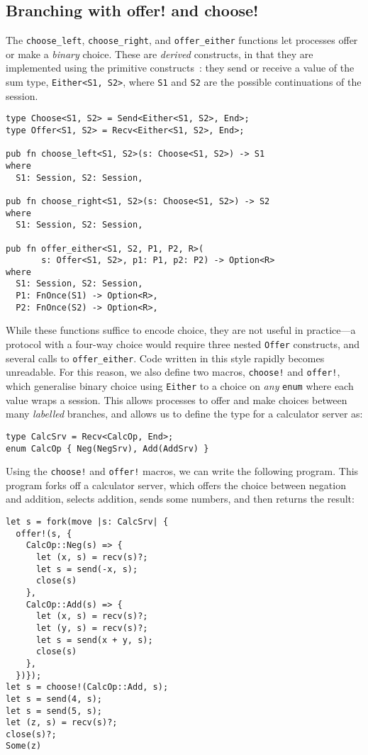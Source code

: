 \documentclass[sigconf,natbib=false]{acmart}
\begin{document}
\subsection{Branching with offer! and choose!}
The \lstinline{choose_left}, \lstinline{choose_right}, and \lstinline{offer_either} functions let processes offer or make a \emph{binary} choice. These are \emph{derived} constructs, in that they are implemented using the primitive constructs~\parencite{honda1993,dardha2017}: they send or receive a value of the sum type, \lstinline{Either<S1, S2>}, where \lstinline{S1} and \lstinline{S2} are the possible continuations of the session.
\begin{lstlisting}
type Choose<S1, S2> = Send<Either<S1, S2>, End>;
type Offer<S1, S2> = Recv<Either<S1, S2>, End>;

pub fn choose_left<S1, S2>(s: Choose<S1, S2>) -> S1
where
  S1: Session, S2: Session,

pub fn choose_right<S1, S2>(s: Choose<S1, S2>) -> S2
where
  S1: Session, S2: Session,

pub fn offer_either<S1, S2, P1, P2, R>(
       s: Offer<S1, S2>, p1: P1, p2: P2) -> Option<R>
where
  S1: Session, S2: Session,
  P1: FnOnce(S1) -> Option<R>,
  P2: FnOnce(S2) -> Option<R>,
\end{lstlisting}
While these functions suffice to encode choice, they are not useful in practice---a protocol with a four-way choice would require three nested \lstinline{Offer} constructs, and several calls to \lstinline{offer_either}. Code written in this style rapidly becomes unreadable. For this reason, we also define two macros, \lstinline{choose!} and \lstinline{offer!}, which generalise binary choice using \lstinline{Either} to a choice on \emph{any} \lstinline{enum} where each value wraps a session. This allows processes to offer and make choices between many \emph{labelled} branches, and allows us to define the type for a calculator server as:
\begin{lstlisting}
type CalcSrv = Recv<CalcOp, End>;
enum CalcOp { Neg(NegSrv), Add(AddSrv) }
\end{lstlisting}
Using the \lstinline{choose!} and \lstinline{offer!} macros, we can write the following program. This program forks off a calculator server, which offers the choice between negation and addition, selects addition, sends some numbers, and then returns the result:
\begin{lstlisting}
let s = fork(move |s: CalcSrv| {
  offer!(s, {
    CalcOp::Neg(s) => {
      let (x, s) = recv(s)?;
      let s = send(-x, s);
      close(s)
    },
    CalcOp::Add(s) => {
      let (x, s) = recv(s)?;
      let (y, s) = recv(s)?;
      let s = send(x + y, s);
      close(s)
    },
  })});
let s = choose!(CalcOp::Add, s);
let s = send(4, s);
let s = send(5, s);
let (z, s) = recv(s)?;
close(s)?;
Some(z)
\end{lstlisting}
\end{document}
